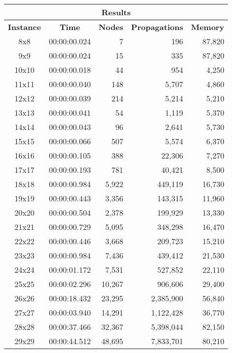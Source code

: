
\begin{center}
    \begin{tabular}{|c|c|r|r|r|}
        \hline
        \multicolumn{5}{|c|}{\textbf{Results}} \\
        \hline
        \textbf{Instance} & \textbf{Time} & \textbf{Nodes} & \textbf{Propagations} & \textbf{Memory} \\
        
        \hline
		8x8 & 00:00:00.024 & 7 & 196 & 87,820 \\ \hline
		9x9 & 00:00:00.024 & 15 & 335 & 87,820 \\ \hline
		10x10 & 00:00:00.018 & 44 & 954 & 4,250 \\ \hline
		11x11 & 00:00:00.040 & 148 & 5,707 & 4,860 \\ \hline
		12x12 & 00:00:00.039 & 214 & 5,214 & 5,210 \\ \hline
		13x13 & 00:00:00.041 & 54 & 1,119 & 5,370 \\ \hline
		14x14 & 00:00:00.043 & 96 & 2,641 & 5,730 \\ \hline
		15x15 & 00:00:00.066 & 507 & 5,574 & 6,370 \\ \hline
		16x16 & 00:00:00.105 & 388 & 22,306 & 7,270 \\ \hline
		17x17 & 00:00:00.193 & 781 & 40,421 & 8,500 \\ \hline
		18x18 & 00:00:00.984 & 5,922 & 449,119 & 16,730 \\ \hline
		19x19 & 00:00:00.443 & 3,356 & 143,315 & 11,960 \\ \hline
		20x20 & 00:00:00.504 & 2,378 & 199,929 & 13,330 \\ \hline
		21x21 & 00:00:00.729 & 5,095 & 348,298 & 16,470 \\ \hline
		22x22 & 00:00:00.446 & 3,668 & 209,723 & 15,210 \\ \hline
		23x23 & 00:00:00.984 & 7,436 & 439,412 & 21,530 \\ \hline
		24x24 & 00:00:01.172 & 7,531 & 527,852 & 22,110 \\ \hline
		25x25 & 00:00:02.296 & 10,267 & 906,606 & 29,400 \\ \hline
		26x26 & 00:00:18.432 & 23,295 & 2,385,900 & 56,840 \\ \hline
		27x27 & 00:00:03.940 & 14,291 & 1,122,428 & 36,770 \\ \hline
		28x28 & 00:00:37.466 & 32,367 & 5,398,044 & 82,150 \\ \hline
		29x29 & 00:00:44.512 & 48,695 & 7,833,701 & 80,210 \\ \hline

\end{tabular}
\end{center}
